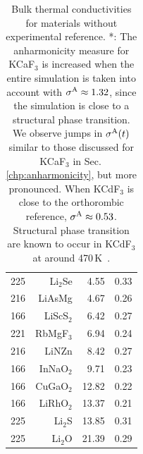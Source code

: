 \begin{table}[ht]
\begin{tabular}{rrrr}
         225 &    Li$_2$Se &                4.55 &       0.33 \\
         216 &      LiAsMg &                4.67 &       0.26 \\
         166 &   LiScS$_2$ &                6.42 &       0.27 \\
         221 &   RbMgF$_3$ &                6.94 &       0.24 \\
         216 &       LiNZn &                8.42 &       0.27 \\
         166 &   InNaO$_2$ &                9.71 &       0.23 \\
         166 &   CuGaO$_2$ &               12.82 &       0.22 \\
         166 &   LiRhO$_2$ &               13.37 &       0.21 \\
         225 &     Li$_2$S &               13.85 &       0.31 \\
         225 &     Li$_2$O &               21.39 &       0.29 \\
\bottomrule
\end{tabular}
  \caption{Bulk thermal conductivities for materials without experimental reference. *: The anharmonicity measure for KCaF$_3$ is increased when the entire simulation is taken into account with $\sigma^\mathrm{A} \approx 1.32$, since the simulation is close to a structural phase transition. We observe jumps in $\sigma^\mathrm{A} (t)$ similar to those discussed for KCaF$_3$ in Sec.\,\ref{chp:anharmonicity}, but more pronounced. When KCdF$_3$ is close to the orthorombic reference, $\sigma^\mathrm{A} \approx 0.53$. Structural phase transition are known to occur in KCdF$_3$ at around 470\,K~\cite{hidaka1977,hidaka1990}.}
  \label{tab:kappa.noexp}
\end{table}
